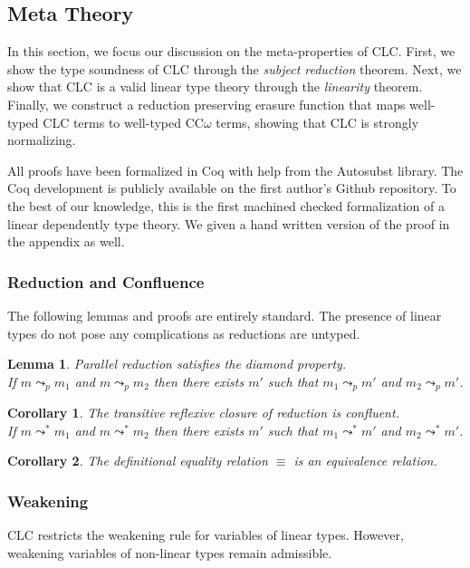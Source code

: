 \documentclass{article}
\newtheorem{corollary}{Corollary}[theorem]
\newtheorem{lemma}[theorem]{Lemma}
\theoremstyle{definition}
\newcommand{\step}{\leadsto}
\newcommand{\pstep}{\leadsto}
\begin{document}
  \subsection{Meta Theory} \label{meta}
  In this section, we focus our discussion on the meta-properties of CLC. First, we show the type soundness of CLC through the \textit{subject reduction} theorem. Next, we show that CLC is a valid linear type theory through the \textit{linearity} theorem. Finally, we construct a reduction preserving erasure function that maps well-typed CLC terms to well-typed CC$\omega$ terms, showing that CLC is strongly normalizing.
  
  All proofs have been formalized in Coq with help from the Autosubst \cite{autosubst} library. The Coq development is publicly available on the first author's Github repository. To the best of our knowledge, this is the first machined checked formalization of a linear dependently type theory. We given a hand written version of the proof in the appendix as well.

  \subsubsection{Reduction and Confluence}

  The following lemmas and proofs are entirely standard. The presence of linear types do not pose any complications as reductions are untyped.

  \begin{lemma} Parallel reduction satisfies the diamond property. \\
    If $m \pstep_p m_1$ and $m \pstep_p m_2$ then there exists $m'$ such that $m_1 \pstep_p m'$ and $m_2 \pstep_p m'$.
  \end{lemma}

  \begin{corollary} The transitive reflexive closure of  reduction is confluent. \\ 
    If $m \step^* m_1$ and $m \step^* m_2$ then there exists $m'$ such that $m_1 \pstep^* m'$ and $m_2 \pstep^* m'$.
  \end{corollary}

  \begin{corollary}
    The definitional equality relation $\equiv$ is an equivalence relation.
  \end{corollary}

  \subsubsection{Weakening} \label{subst}
  CLC restricts the weakening rule for variables of linear types. However, weakening variables of non-linear types remain admissible.
\end{document}
